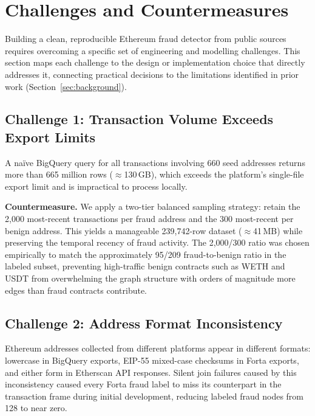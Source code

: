 \section{Challenges and Countermeasures}
\label{sec:challenges}

Building a clean, reproducible Ethereum fraud detector from public
sources requires overcoming a specific set of engineering and modelling
challenges.  This section maps each challenge to the design or
implementation choice that directly addresses it, connecting practical
decisions to the limitations identified in prior work
(Section~\ref{sec:background}).

\subsection{Challenge 1: Transaction Volume Exceeds Export Limits}

A na\"ive BigQuery query for all transactions involving 660 seed
addresses returns more than 665 million rows ($\approx$130\,GB), which
exceeds the platform's single-file export limit and is impractical to
process locally.

\textbf{Countermeasure.}
We apply a two-tier balanced sampling strategy: retain the 2,000
most-recent transactions per fraud address and the 300 most-recent per
benign address.  This yields a manageable 239,742-row dataset
($\approx$41\,MB) while preserving the temporal recency of fraud
activity.  The 2,000/300 ratio was chosen empirically to match the
approximately 95/209 fraud-to-benign ratio in the labeled subset,
preventing high-traffic benign contracts such as WETH and USDT from
overwhelming the graph structure with orders of magnitude more edges
than fraud contracts contribute.

\subsection{Challenge 2: Address Format Inconsistency}

Ethereum addresses collected from different platforms appear in
different formats: lowercase in BigQuery exports, EIP-55 mixed-case
checksums in Forta exports, and either form in Etherscan API responses.
Silent join failures caused by this inconsistency caused every Forta
fraud label to miss its counterpart in the transaction frame during
initial development, reducing labeled fraud nodes from 128 to near zero.


